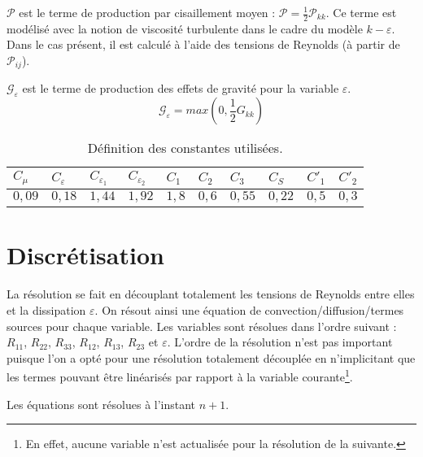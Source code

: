 $\mathcal{P}$ est le terme de production par cisaillement moyen :
$\mathcal{P} =\displaystyle \frac{1}{2} \mathcal{P}_{kk}$. Ce terme est
mod\'elis\'e avec la notion de viscosit\'e turbulente dans le cadre du mod\`ele
$k-\varepsilon$. Dans le cas pr\'esent, il est calcul\'e \`a l'aide des tensions
de Reynolds (\`a partir de $\mathcal{P}_{ij}$).

$\mathcal{G}_{\varepsilon}$ est le terme de production des effets de gravit\'e pour la variable $\varepsilon$.
\begin{equation}
\mathcal{G}_{\varepsilon} = max(0,\frac{1}{2}G_{kk})
\end{equation}
\begin{table}
{\scriptsize
\begin{center}
\begin{tabular}{|l|l|l|l|l|l|l|l|l|l|}
\hline
$C_\mu$  & $C_{\varepsilon}$  & $C_{\varepsilon_1}$ &
$C_{\varepsilon_2}$  & $C_1$ & $C_2$ & $C_3$ & $C_S$
& $C'_1$ & $C'_2$ \\
\hline
$0,09$ & $ 0,18$ & $1,44$ & $1,92$ & $1,8$ & $0,6$ & $0,55$ & $0,22$ & $0,5$ &
$0,3$ \\
\hline
\end{tabular}
\end{center}
}
\caption{D\'efinition des constantes utilis\'ees.}\label{Base_Turrij_table_Cstes}
\end{table}

\section*{Discr\'etisation}
La r\'esolution se fait en d\'ecouplant totalement les tensions de Reynolds
entre elles et la dissipation $\varepsilon$. On r\'esout ainsi une \'equation de
convection/diffusion/termes sources pour chaque variable. Les variables sont
r\'esolues dans l'ordre suivant : $R_{11}$, $R_{22}$, $R_{33}$, $R_{12}$,
$R_{13}$, $R_{23}$ et $ \varepsilon$. L'ordre de la r\'esolution n'est pas
important puisque l'on a opt\'e pour une r\'esolution totalement d\'ecoupl\'ee
en n'implicitant que les termes pouvant \^etre lin\'earis\'es par rapport \`a la
variable courante\footnote{En effet, aucune variable n'est actualis\'ee pour la r\'esolution de la suivante.}.

Les \'equations sont r\'esolues \`a l'instant $n+1$.
